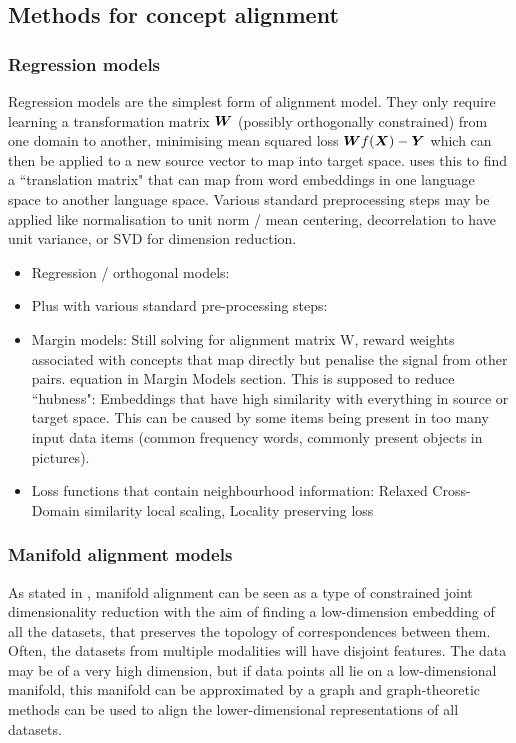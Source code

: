 \subsection{Methods for concept alignment}

\subsubsection{Regression models}

Regression models are the simplest form of alignment model. They only require learning a transformation matrix $\boldsymbol{W}$ (possibly orthogonally constrained) from one domain to another, minimising mean squared loss $ \boldsymbol{W} f(\boldsymbol{X}) - \boldsymbol{Y}$ which can then be applied to a new source vector to map into target space. \cite{MikolovMachineTranslation} uses this to find a ``translation matrix" that can map from word embeddings in one language space to another language space. Various standard preprocessing steps may be applied like normalisation to unit norm / mean centering, decorrelation to have unit variance, or SVD for dimension reduction.

\begin{itemize}
        \item Regression / orthogonal models: \cite{kalinowski2020survey} 
        \item Plus with various standard pre-processing steps:  
        \item Margin models: Still solving for alignment matrix W, reward weights associated with concepts that map directly but penalise the signal from other pairs. \cite{kalinowski2020survey} equation in Margin Models section. This is supposed to reduce ``hubness": Embeddings that have high similarity with everything in source or target space. This can be caused by some items being present in too many input data items (common frequency words, commonly present objects in pictures). 
        \item Loss functions that contain neighbourhood information: Relaxed Cross-Domain similarity local scaling, Locality preserving loss 
\end{itemize}

\subsubsection{Manifold alignment models}

As stated in \cite{ManifoldLearningTheoryAndApplications}, manifold alignment can be seen as a type of constrained joint dimensionality reduction with the aim of finding a low-dimension embedding of all the datasets, that preserves the topology of correspondences between them. Often, the datasets from multiple modalities will have disjoint features. The data may be of a very high dimension, but if data points all lie on a low-dimensional manifold, this manifold can be approximated by a graph and graph-theoretic methods can be used to align the lower-dimensional representations of all datasets. 

